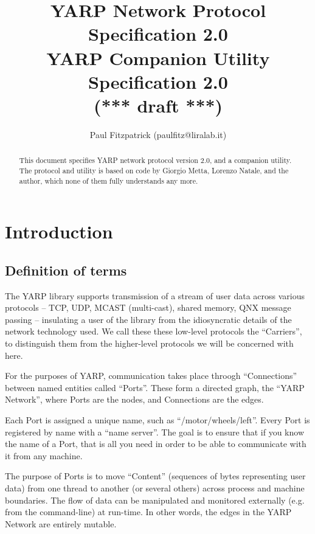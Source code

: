 \documentclass[a4]{article}
\title{
YARP Network Protocol Specification 2.0 \\
YARP Companion Utility Specification 2.0 \\
(*** draft ***)
}
\author{Paul Fitzpatrick (paulfitz@liralab.it)}
\begin{document}
\maketitle


\begin{abstract}

\noindent
This document specifies YARP network protocol version 2.0,
and a companion utility.  The
protocol and utility is based on code by Giorgio
Metta, Lorenzo Natale, and the author, which none of them fully
understands any more.

\end{abstract}



\tableofcontents

\section{Introduction}

\subsection{Definition of terms}

The YARP library supports transmission of a stream of
user data across
various protocols -- TCP, UDP, MCAST (multi-cast), shared memory, QNX
message passing -- insulating a user of the library from the
idiosyncratic details of the network technology used.  We call these
these low-level protocols the ``Carriers'', to distinguish them from
the higher-level protocols we will be concerned with here.

For the purposes of YARP, communication takes place throogh
``Connections'' between named entities called ``Ports''.
These form a directed graph, the ``YARP Network'', where Ports are the nodes,
and Connections are the edges.

Each Port is assigned a unique name, such as ``/motor/wheels/left''.  
Every Port is registered by name with
a ``name server''.  The goal is to ensure that if you know the name
of a Port, that is all you need in order to be able to 
communicate with it from any machine.

The purpose of Ports is to move ``Content'' (sequences of bytes representing 
user data) from
one thread to another (or several others) across process and machine
boundaries.  The flow of data can be manipulated and monitored
externally (e.g. from the command-line) at run-time.  In other words,
the edges in the YARP Network are entirely mutable.
\end{document}
